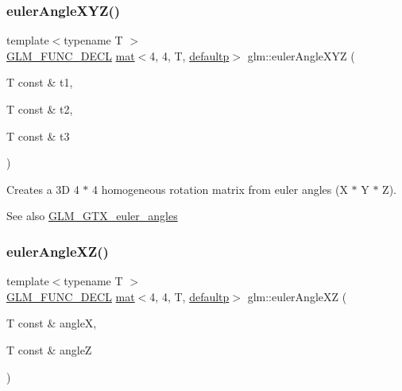 \subsubsection{\texorpdfstring{euler\+Angle\+X\+Y\+Z()}{eulerAngleXYZ()}}
{\footnotesize\ttfamily template$<$typename T $>$ \\
\hyperlink{setup_8hpp_ab2d052de21a70539923e9bcbf6e83a51}{G\+L\+M\+\_\+\+F\+U\+N\+C\+\_\+\+D\+E\+CL} \hyperlink{structglm_1_1mat}{mat}$<$4, 4, T, \hyperlink{namespaceglm_a36ed105b07c7746804d7fdc7cc90ff25a9d21ccd8b5a009ec7eb7677befc3bf51}{defaultp}$>$ glm\+::euler\+Angle\+X\+YZ (\begin{DoxyParamCaption}\item[{T const \&}]{t1,  }\item[{T const \&}]{t2,  }\item[{T const \&}]{t3 }\end{DoxyParamCaption})}

Creates a 3D 4 $\ast$ 4 homogeneous rotation matrix from euler angles (X $\ast$ Y $\ast$ Z). \begin{DoxySeeAlso}{See also}
\hyperlink{group__gtx__euler__angles}{G\+L\+M\+\_\+\+G\+T\+X\+\_\+euler\+\_\+angles} 
\end{DoxySeeAlso}
\mbox{\label{group__gtx__euler__angles_gaa39bd323c65c2fc0a1508be33a237ce9}} 
\subsubsection{\texorpdfstring{euler\+Angle\+X\+Z()}{eulerAngleXZ()}}
{\footnotesize\ttfamily template$<$typename T $>$ \\
\hyperlink{setup_8hpp_ab2d052de21a70539923e9bcbf6e83a51}{G\+L\+M\+\_\+\+F\+U\+N\+C\+\_\+\+D\+E\+CL} \hyperlink{structglm_1_1mat}{mat}$<$4, 4, T, \hyperlink{namespaceglm_a36ed105b07c7746804d7fdc7cc90ff25a9d21ccd8b5a009ec7eb7677befc3bf51}{defaultp}$>$ glm\+::euler\+Angle\+XZ (\begin{DoxyParamCaption}\item[{T const \&}]{angleX,  }\item[{T const \&}]{angleZ }\end{DoxyParamCaption})}

